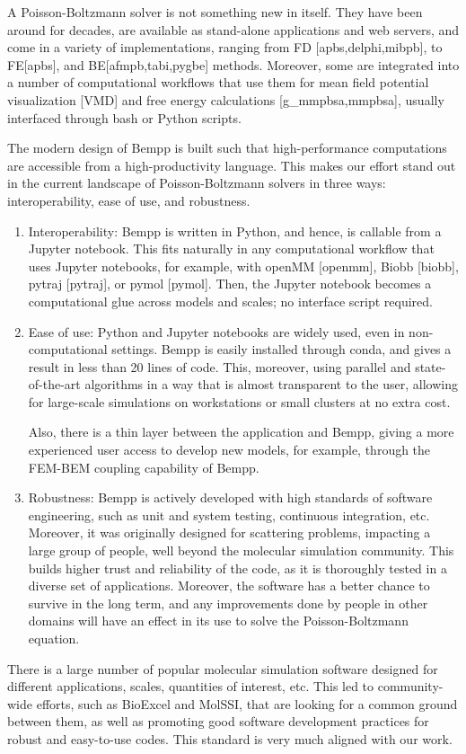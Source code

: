 A Poisson-Boltzmann solver is not something new in itself. They have been around for decades, are available as stand-alone applications and web servers, and come in a variety of implementations, ranging from FD [apbs,delphi,mibpb], to FE[apbs], and BE[afmpb,tabi,pygbe] methods. Moreover, some are integrated into a number of computational workflows that use them for mean field potential visualization [VMD] and free energy calculations [g\_mmpbsa,mmpbsa], usually interfaced through bash or Python scripts.

The modern design of Bempp is built such that high-performance computations are accessible from a high-productivity language. This makes our effort stand out in the current landscape of Poisson-Boltzmann solvers in three ways: interoperability, ease of use, and robustness. 
\begin{enumerate}
\item Interoperability: Bempp is written in Python, and hence, is callable from a Jupyter notebook. This fits naturally in any computational workflow that uses Jupyter notebooks, for example, with openMM [openmm], Biobb [biobb], pytraj [pytraj], or pymol [pymol]. Then, the Jupyter notebook becomes a computational glue across models and scales; no interface script required. 

\item Ease of use: Python and Jupyter notebooks are widely used, even in non-computational settings. Bempp is easily installed through conda, and gives a result in less than 20 lines of code. This, moreover, using parallel and state-of-the-art algorithms in a way that is almost transparent to the user, allowing for large-scale simulations on workstations or small clusters at no extra cost.

Also, there is a thin layer between the application and Bempp, giving a more experienced user access to develop new models, for example, through the FEM-BEM coupling capability of Bempp.

\item Robustness: Bempp is actively developed with high standards of software engineering, such as unit and system testing, continuous integration, etc. Moreover, it was originally designed for scattering problems, impacting a large group of people, well beyond the molecular simulation community. This builds higher trust and reliability of the code, as it is thoroughly tested in a diverse set of applications. Moreover, the software has a better chance to survive in the long term, and any improvements done by people in other domains will have an effect in its use to solve the Poisson-Boltzmann equation. 

\end{enumerate}

There is a large number of popular molecular simulation software designed for different applications, scales, quantities of interest, etc. This led to community-wide efforts, such as BioExcel and MolSSI, that are looking for a common ground between them, as well as promoting good software development practices for robust and easy-to-use codes. This standard is very much aligned with our work.

